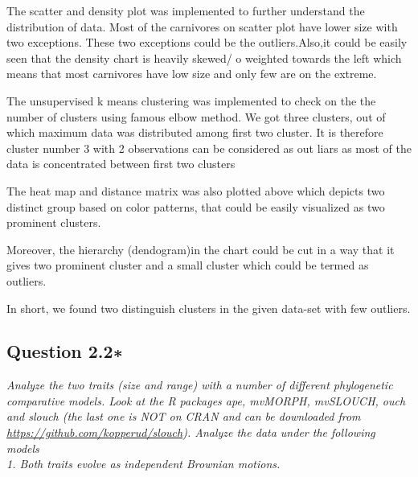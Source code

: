 \documentclass[
]{article}
\newenvironment{Shaded}{\begin{snugshade}}{\end{snugshade}}
\newcommand{\AttributeTok}[1]{\textcolor[rgb]{0.77,0.63,0.00}{#1}}
\newcommand{\CommentTok}[1]{\textcolor[rgb]{0.56,0.35,0.01}{\textit{#1}}}
\newcommand{\ConstantTok}[1]{\textcolor[rgb]{0.00,0.00,0.00}{#1}}
\newcommand{\FunctionTok}[1]{\textcolor[rgb]{0.00,0.00,0.00}{#1}}
\newcommand{\NormalTok}[1]{#1}
\newcommand{\OtherTok}[1]{\textcolor[rgb]{0.56,0.35,0.01}{#1}}
\newcommand{\SpecialCharTok}[1]{\textcolor[rgb]{0.00,0.00,0.00}{#1}}
\newcommand{\StringTok}[1]{\textcolor[rgb]{0.31,0.60,0.02}{#1}}
\begin{document}
The scatter and density plot was implemented to further understand the
distribution of data. Most of the carnivores on scatter plot have lower
size with two exceptions. These two exceptions could be the
outliers.Also,it could be easily seen that the density chart is heavily
skewed/ o weighted towards the left which means that most carnivores
have low size and only few are on the extreme.

The unsupervised k means clustering was implemented to check on the the
number of clusters using famous elbow method. We got three clusters, out
of which maximum data was distributed among first two cluster. It is
therefore cluster number 3 with 2 observations can be considered as out
liars as most of the data is concentrated between first two clusters

The heat map and distance matrix was also plotted above which depicts
two distinct group based on color patterns, that could be easily
visualized as two prominent clusters.

Moreover, the hierarchy (dendogram)in the chart could be cut in a way
that it gives two prominent cluster and a small cluster which could be
termed as outliers.

In short, we found two distinguish clusters in the given data-set with
few outliers.

\hypertarget{question-2.2}{%
\subsection{Question 2.2∗}\label{question-2.2}}

\emph{Analyze the two traits (size and range) with a number of diﬀerent
phylogenetic comparative models. Look at the R packages ape, mvMORPH,
mvSLOUCH, ouch and slouch (the last one is NOT on CRAN and can be
downloaded from \url{https://github.com/kopperud/slouch}). Analyze the
data under the following models}\\
\emph{1. Both traits evolve as independent Brownian motions.}

\begin{Shaded}
\end{Shaded}
\end{document}
